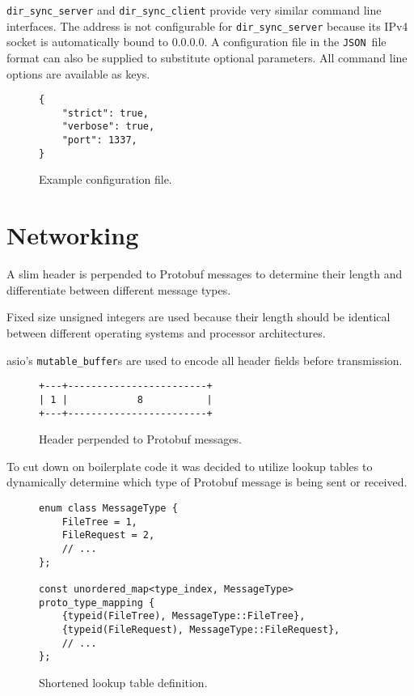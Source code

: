 \documentclass[a4paper]{article}
\begin{document}
\texttt{dir\_sync\_server} and \texttt{dir\_sync\_client} provide very similar command line interfaces. The address is not configurable for \texttt{dir\_sync\_server} because its IPv4 socket is automatically bound to 0.0.0.0. 
\bigbreak
A configuration file in the \texttt{JSON} file format can also be supplied to substitute optional parameters. All command line options are available as keys.

\begin{figure}[H]
\begin{verbatim}
{
	"strict": true,
	"verbose": true,
	"port": 1337,
}

\end{verbatim}
\caption{Example configuration file.}
\end{figure}

\section{Networking}
A slim header is perpended to Protobuf messages to determine their length and differentiate between different message types. 

Fixed size unsigned integers are used because their length should be identical between different operating systems and processor architectures. 

asio's \texttt{mutable\_buffer}s are used to encode all header fields before transmission.
\begin{figure}[H]
\centering
\begin{BVerbatim}
+---+------------------------+
| 1 |            8           |
+---+------------------------+
\end{BVerbatim}
\caption{Header perpended to Protobuf messages.}
\end{figure}

To cut down on boilerplate code it was decided to utilize lookup tables to dynamically determine which type of Protobuf message is being sent or received. 

\begin{figure}[H]
\begin{verbatim}
enum class MessageType {
	FileTree = 1,
	FileRequest = 2,
	// ...
};

const unordered_map<type_index, MessageType> proto_type_mapping {
	{typeid(FileTree), MessageType::FileTree},
	{typeid(FileRequest), MessageType::FileRequest},
	// ...
};
\end{verbatim}
\caption{Shortened lookup table definition.}
\end{figure}
\end{document}
